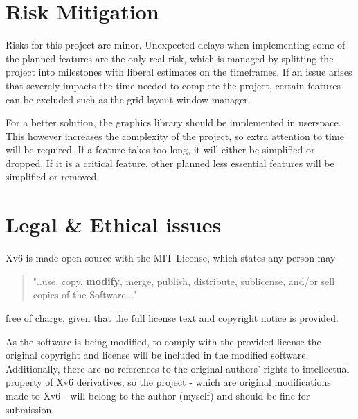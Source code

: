 %
%
\section{Risk Mitigation}

Risks for this project are minor. Unexpected delays when implementing some of the
planned features are the only real risk, which is managed by splitting the project
into milestones with liberal estimates on the timeframes. If an issue arises that
severely impacts the time needed to complete the project, certain features can be
excluded such as the grid layout window manager.

For a better solution, the graphics library should be implemented in userspace.
This however increases the complexity of the project, so extra attention to time
will be required. If a feature takes too long, it will either be simplified or dropped.
If it is a critical feature, other planned less essential features will be simplified or
removed.

%
%
\section{Legal \& Ethical issues}

Xv6 is made open source with the MIT License, which states any person may
\begin{quote}
    "..use, copy, \textbf{modify}, merge, publish,
    distribute, sublicense, and/or sell copies of the Software..."
\end{quote}
free of charge, given that the full license text and copyright notice
is provided.

As the software is being modified, to comply with the provided license the
original copyright and license will be included in the modified software.
Additionally, there are no references to the original authors' rights to intellectual
property of Xv6 derivatives, so the project - which are original modifications
made to Xv6 - will belong to the author (myself) and should be fine for submission.

